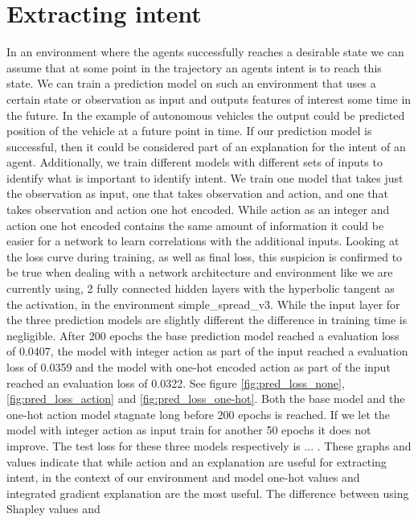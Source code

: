 \documentclass[UKenglish]{uiomasterthesis}
\begin{document}
\section{Extracting intent}
\label{sec:intent_meth}


In an environment where the agents successfully reaches a desirable state we can assume that at some point in the trajectory an agents intent is to reach this state. We can train a prediction model on such an environment that uses a certain state or observation as input and outputs features of interest some time in the future. In the example of autonomous vehicles the output could be predicted position of the vehicle at a future point in time. If our prediction model is successful, then it could be considered part of an explanation for the intent of an agent.
Additionally, we train different models with different sets of inputs to identify what is important to identify intent. We train one model that takes just the observation as input, one that takes observation and action, and one that takes observation and action one hot encoded. While action as an integer and action one hot encoded contains the same amount of information it could be easier for a network to learn correlations with the additional inputs. Looking at the loss curve during training, as well as final loss, this suspicion is confirmed to be true when dealing with a network architecture and environment like we are currently using, 2 fully connected hidden layers with the hyperbolic tangent as the activation, in the environment simple\_spread\_v3. While the input layer for the three prediction models are slightly different the difference in training time is negligible. 
After 200 epochs the base prediction model reached a evaluation loss of 0.0407, the model with integer action as part of the input reached a evaluation loss of 0.0359 and the model with one-hot encoded action as part of the input reached an evaluation loss of 0.0322. See figure \ref{fig:pred_loss_none}, \ref{fig:pred_loss_action} and \ref{fig:pred_loss_one-hot}. Both the base model and the one-hot action model stagnate long before 200 epochs is reached. If we let the model with integer action as input train for another 50 epochs it does not improve. The test loss for these three models respectively is ... . These graphs and values indicate that while action and an explanation are useful for extracting intent, in the context of our environment and model one-hot values and integrated gradient explanation are the most useful. The difference between using Shapley values and
\end{document}
